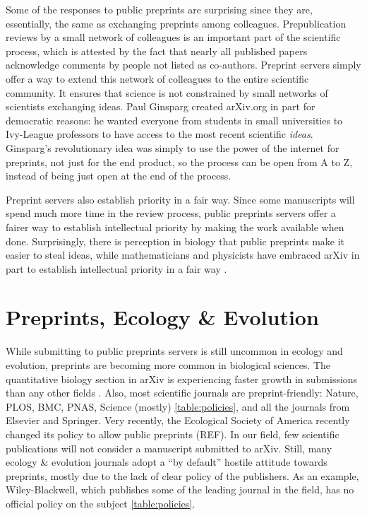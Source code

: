 \documentclass[letterpaper,twocolumn,superscriptaddress,showkeys]{revtex4}
\begin{document}
Some of the responses to public preprints are surprising since they are,
essentially, the same as exchanging preprints among colleagues.
Prepublication reviews by a small network of colleagues is an
important part of the scientific process, which is attested by the
fact that nearly all published papers acknowledge comments by people
not listed as co-authors.  Preprint servers simply offer a way to
extend this network of colleagues to the entire scientific
community. It ensures that science is not constrained by small
networks of scientists exchanging ideas.  Paul Ginsparg created
arXiv.org in part for democratic reasons: he wanted everyone from
students in small universities to Ivy-League professors to have access
to the most recent scientific \emph{ideas}.
Ginsparg's revolutionary idea was simply to use the power of the
internet for preprints, not just for the end product, so the process
can be open from A to Z, instead of being just open at the end of the
process.

Preprint servers also establish priority in a fair way. Since some manuscripts
will spend much more time in the review process, public preprints servers offer
a fairer way to establish intellectual priority by making the work available
when done. Surprisingly, there is perception in biology that public preprints
make it easier to steal ideas, while mathematicians and physicists have embraced
arXiv in part to establish intellectual priority in a fair way \cite{cal12}.

\section{Preprints, Ecology \& Evolution}

While submitting to public preprints servers is still uncommon in ecology and
evolution, preprints are becoming more common in biological sciences. The
quantitative biology section in arXiv is experiencing faster growth in
submissions than any other fields \cite{cal12}. Also, most scientific journals
are preprint-friendly: Nature, PLOS, BMC, PNAS, Science (mostly)
\ref{table:policies}, and all the journals from Elsevier and Springer. Very
recently, the Ecological Society of America recently changed its policy to allow
public preprints (REF). In our field, few scientific publications will not
consider a manuscript submitted to arXiv.  Still, many ecology \& evolution
journals adopt a ``by default'' hostile attitude towards preprints, mostly due
to the lack of clear policy of the publishers. As an example, Wiley-Blackwell,
which publishes some of the leading journal in the field, has no official policy
on the subject \ref{table:policies}.
\end{document}
